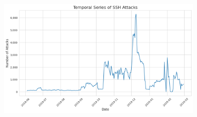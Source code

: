     \begin{figure}[H]
        \centering
        \includegraphics[width=0.9\textwidth]{../figures/plots/section1/temporal_series_of_ssh_attacks.png}
        \caption{}
        \label{fig:}
    \end{figure}
    